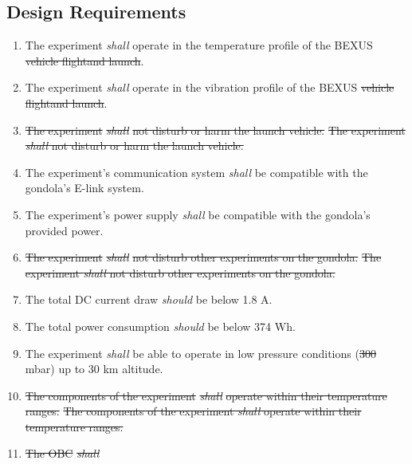 \documentclass[a4paper,12pt,twoside]{article}
\providecommand{\DIFaddtex}[1]{{\protect\color{blue}\uwave{#1}}} %
\providecommand{\DIFdeltex}[1]{{\protect\color{red}\sout{#1}}}                      %
\providecommand{\DIFaddbegin}{} %
\providecommand{\DIFaddend}{} %
\providecommand{\DIFdelbegin}{} %
\providecommand{\DIFdelend}{} %
\providecommand{\DIFadd}[1]{\texorpdfstring{\DIFaddtex{#1}}{#1}} %
\providecommand{\DIFdel}[1]{\texorpdfstring{\DIFdeltex{#1}}{}} %
\newcommand{\DIFscaledelfig}{0.5}
\newlength{\DIFdelgraphicswidth} %
\newlength{\DIFdelgraphicsheight} %
\newcommand{\DIFaddincludegraphics}[2][]{{\color{blue}\fbox{\DIFOincludegraphics[#1]{#2}}}} %
\newcommand{\DIFdelincludegraphics}[2][]{%
\sbox{\DIFdelgraphicsbox}{\DIFOincludegraphics[#1]{#2}}%
\settoboxwidth{\DIFdelgraphicswidth}{\DIFdelgraphicsbox} %
\settoboxtotalheight{\DIFdelgraphicsheight}{\DIFdelgraphicsbox} %
\scalebox{\DIFscaledelfig}{%
\parbox[b]{\DIFdelgraphicswidth}{\usebox{\DIFdelgraphicsbox}\\[-\baselineskip] \rule{\DIFdelgraphicswidth}{0em}}\llap{\resizebox{\DIFdelgraphicswidth}{\DIFdelgraphicsheight}{%
\setlength{\unitlength}{\DIFdelgraphicswidth}%
\begin{picture}(1,1)%
\thicklines\linethickness{2pt} %
{\color[rgb]{1,0,0}\put(0,0){\framebox(1,1){}}}%
{\color[rgb]{1,0,0}\put(0,0){\line( 1,1){1}}}%
{\color[rgb]{1,0,0}\put(0,1){\line(1,-1){1}}}%
\end{picture}%
}\hspace*{3pt}}} %
} %
\DeclareRobustCommand{\DIFaddbegin}{\DIFOaddbegin \let\includegraphics\DIFaddincludegraphics} %
\DeclareRobustCommand{\DIFaddend}{\DIFOaddend \let\includegraphics\DIFOincludegraphics} %
\DeclareRobustCommand{\DIFdelbegin}{\DIFOdelbegin \let\includegraphics\DIFdelincludegraphics} %
\DeclareRobustCommand{\DIFdelend}{\DIFOaddend \let\includegraphics\DIFOincludegraphics} %
\begin{document}
\subsection{Design Requirements}

\begin{enumerate}[label=D.\arabic*]
    \item The experiment \textit{shall} operate in the temperature profile of the BEXUS \DIFdelbegin \DIFdel{vehicle flightand launch}\DIFdelend \DIFaddbegin \DIFadd{flight}\DIFaddend .
    \item The experiment \textit{shall} operate in the vibration profile of the BEXUS \DIFdelbegin \DIFdel{vehicle flightand launch}\DIFdelend \DIFaddbegin \DIFadd{flight}\DIFaddend .
    \item \DIFdelbegin \DIFdel{The experiment }\textit{\DIFdel{shall}} %
\DIFdel{not disturb or harm the launch vehicle.
    }\DIFdelend \DIFaddbegin \st{The experiment \textit{shall} not disturb or harm the launch vehicle.}\DIFadd{\textsuperscript{\ref{fn:unnecessary-requirement}}
    }\DIFaddend \item The experiment's communication system \textit{shall} be compatible with the gondola's E-link system.
    \item The experiment's power supply \textit{shall} be compatible with the gondola's provided power.
    \item \DIFdelbegin \DIFdel{The experiment }\textit{\DIFdel{shall}} %
\DIFdel{not disturb other experiments on the gondola.
    }\DIFdelend \DIFaddbegin \st{The experiment \textit{shall} not disturb other experiments on the gondola.}\DIFadd{\textsuperscript{\ref{fn:unnecessary-requirement}}
    }\DIFaddend \item The total DC current draw \textit{should} be below 1.8 A.
    \item The total power consumption \textit{should} be below 374 Wh.
    \item The experiment \textit{shall} be able to operate in low pressure conditions (\DIFdelbegin \DIFdel{300 }\DIFdelend \DIFaddbegin \DIFadd{10-15 }\DIFaddend mbar) up to 30 km altitude.
    \item \DIFdelbegin \DIFdel{The components of the experiment }\textit{\DIFdel{shall}} %
\DIFdel{operate within their temperature ranges.
    }\DIFdelend \DIFaddbegin \st{The components of the experiment \textit{shall} operate within their temperature ranges.}\DIFadd{\textsuperscript{\ref{fn:unnecessary-requirement}}
    }\DIFaddend \item \DIFdelbegin \DIFdel{The OBC }\textit{\DIFdel{shall}} %

\end{enumerate}
\end{document}
